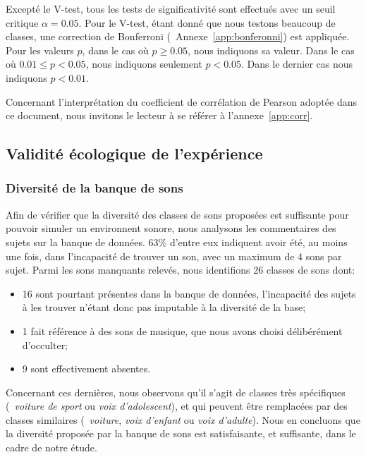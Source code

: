 Excepté le V-test, tous les tests de significativité sont effectués avec un seuil critique $\alpha=0.05$. Pour le V-test, étant donné que nous testons beaucoup de classes, une correction de Bonferroni (\cf~Annexe~\ref{app:bonferonni}) est appliquée. Pour les valeurs $p$, dans le cas où $p\geq0.05$, nous indiquons sa valeur. Dans le cas où $0.01\leq p<0.05$, nous indiquons seulement $p<0.05$. Dans le dernier cas nous indiquons $p<0.01$.

Concernant l'interprétation du coefficient de corrélation de Pearson adoptée dans ce document, nous invitons le lecteur à se référer à l'annexe~\ref{app:corr}.

\subsection{Validité écologique de l'expérience}

\subsubsection{Diversité de la banque de sons}

Afin de vérifier que la diversité des classes de sons proposées est suffisante pour pouvoir simuler un environnent sonore, nous analysons les commentaires des sujets sur la banque de données. 63\% d'entre eux indiquent avoir été, au moins une fois, dans l'incapacité de trouver un son, avec un maximum de 4 sons par sujet. Parmi les sons manquants relevés, nous identifions 26 classes de sons dont:

\begin{itemize}
\item 16 sont pourtant présentes dans la banque de données, l'incapacité des sujets à les trouver n'étant donc pas imputable à la diversité de la base;
\item 1 fait référence à des sons de musique, que nous avons choisi délibérément d'occulter;
\item 9 sont effectivement absentes.  
\end{itemize}

Concernant ces dernières, nous observons qu'il s'agit de classes très spécifiques (\eg~\emph{voiture de sport} ou \emph{voix d'adolescent}), et qui peuvent être remplacées par des classes similaires (\eg~\emph{voiture}, \emph{voix d'enfant} ou \emph{voix d'adulte}). Nous en concluons que la diversité proposée par la banque de sons est satisfaisante, et suffisante, dans le cadre de notre étude.

